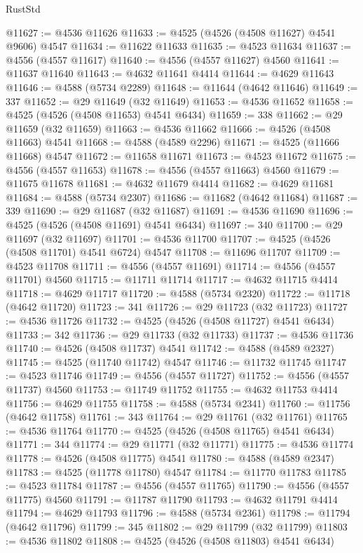 \begin{lexlean}{RustStd}
\begin{coremodule}
@11627 := @4536 @11626
@11633 := @4525 (@4526 (@4508 @11627) @4541 @9606) @4547
@11634 := @11622 @11633
@11635 := @4523 @11634
@11637 := @4556 (@4557 @11617)
@11640 := @4556 (@4557 @11627) @4560
@11641 := @11637 @11640
@11643 := @4632 @11641 @4414
@11644 := @4629 @11643
@11646 := @4588 (@5734 @2289)
@11648 := @11644 (@4642 @11646)
@11649 := 337
@11652 := @29 @11649 (@32 @11649)
@11653 := @4536 @11652
@11658 := @4525 (@4526 (@4508 @11653) @4541 @6434)
@11659 := 338
@11662 := @29 @11659 (@32 @11659)
@11663 := @4536 @11662
@11666 := @4526 (@4508 @11663) @4541
@11668 := @4588 (@4589 @2296)
@11671 := @4525 (@11666 @11668) @4547
@11672 := @11658 @11671
@11673 := @4523 @11672
@11675 := @4556 (@4557 @11653)
@11678 := @4556 (@4557 @11663) @4560
@11679 := @11675 @11678
@11681 := @4632 @11679 @4414
@11682 := @4629 @11681
@11684 := @4588 (@5734 @2307)
@11686 := @11682 (@4642 @11684)
@11687 := 339
@11690 := @29 @11687 (@32 @11687)
@11691 := @4536 @11690
@11696 := @4525 (@4526 (@4508 @11691) @4541 @6434)
@11697 := 340
@11700 := @29 @11697 (@32 @11697)
@11701 := @4536 @11700
@11707 := @4525 (@4526 (@4508 @11701) @4541 @6724) @4547
@11708 := @11696 @11707
@11709 := @4523 @11708
@11711 := @4556 (@4557 @11691)
@11714 := @4556 (@4557 @11701) @4560
@11715 := @11711 @11714
@11717 := @4632 @11715 @4414
@11718 := @4629 @11717
@11720 := @4588 (@5734 @2320)
@11722 := @11718 (@4642 @11720)
@11723 := 341
@11726 := @29 @11723 (@32 @11723)
@11727 := @4536 @11726
@11732 := @4525 (@4526 (@4508 @11727) @4541 @6434)
@11733 := 342
@11736 := @29 @11733 (@32 @11733)
@11737 := @4536 @11736
@11740 := @4526 (@4508 @11737) @4541
@11742 := @4588 (@4589 @2327)
@11745 := @4525 (@11740 @11742) @4547
@11746 := @11732 @11745
@11747 := @4523 @11746
@11749 := @4556 (@4557 @11727)
@11752 := @4556 (@4557 @11737) @4560
@11753 := @11749 @11752
@11755 := @4632 @11753 @4414
@11756 := @4629 @11755
@11758 := @4588 (@5734 @2341)
@11760 := @11756 (@4642 @11758)
@11761 := 343
@11764 := @29 @11761 (@32 @11761)
@11765 := @4536 @11764
@11770 := @4525 (@4526 (@4508 @11765) @4541 @6434)
@11771 := 344
@11774 := @29 @11771 (@32 @11771)
@11775 := @4536 @11774
@11778 := @4526 (@4508 @11775) @4541
@11780 := @4588 (@4589 @2347)
@11783 := @4525 (@11778 @11780) @4547
@11784 := @11770 @11783
@11785 := @4523 @11784
@11787 := @4556 (@4557 @11765)
@11790 := @4556 (@4557 @11775) @4560
@11791 := @11787 @11790
@11793 := @4632 @11791 @4414
@11794 := @4629 @11793
@11796 := @4588 (@5734 @2361)
@11798 := @11794 (@4642 @11796)
@11799 := 345
@11802 := @29 @11799 (@32 @11799)
@11803 := @4536 @11802
@11808 := @4525 (@4526 (@4508 @11803) @4541 @6434)

\end{coremodule}
\end{lexlean}
